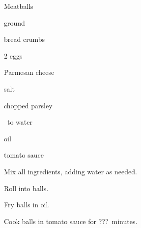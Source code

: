 \begin{recipe}{Meatballs}{}{}

\begin{ingredients}
\item {} ground 
\item \lbs{\half} bread crumbs
\item 2 eggs
\item {} Parmesan cheese
\item salt
\item chopped parsley
\item \quarter\ to \C{\half} water
\item oil
\item tomato sauce
\end{ingredients}

\begin{directions}
\item Mix all ingredients, adding water as needed.
\item Roll into balls.
\item Fry balls in oil.
\item Cook balls in tomato sauce for ???~minutes.
\end{directions}
\end{recipe}
